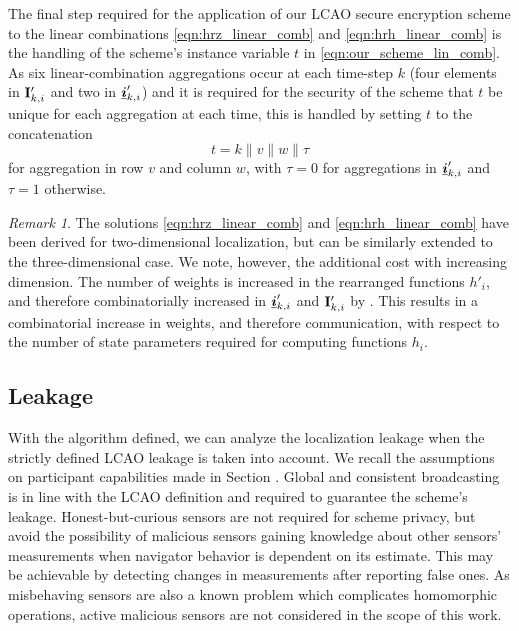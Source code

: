 \documentclass[10pt,letterpaper,oneside,twocolumn,journal]{IEEEtran}
\theoremstyle{definition}
\theoremstyle{definition}
\theoremstyle{remark}
\newtheorem*{remark}{Remark}
\begin{document}
The final step required for the application of our LCAO secure encryption scheme to the linear combinations \eqref{eqn:hrz_linear_comb} and \eqref{eqn:hrh_linear_comb} is the handling of the scheme's instance variable $t$ in \eqref{eqn:our_scheme_lin_comb}. As six linear-combination aggregations occur at each time-step $k$ (four elements in ${{\mathbf{I}}}'_{k,i}$ and two in ${\boldsymbol{\underline{i}}}'_{k,i}$) and it is required for the security of the scheme that $t$ be unique for each aggregation at each time, this is handled by setting $t$ to the concatenation 
\begin{equation}
    t=k\mathbin\|v\mathbin\|w\mathbin\|\tau
\end{equation}
for aggregation in row $v$ and column $w$, with $\tau=0$ for aggregations in ${\boldsymbol{\underline{i}}}'_{k,i}$ and $\tau=1$ otherwise.
\begin{remark}
    The solutions \eqref{eqn:hrz_linear_comb} and \eqref{eqn:hrh_linear_comb} have been derived for two-dimensional localization, but can be similarly extended to the three-dimensional case. We note, however, the additional cost with increasing dimension. The number of weights is increased in the rearranged functions $h'_i$, and therefore combinatorially increased in ${\boldsymbol{\underline{i}}}'_{k,i}$ and ${{\mathbf{I}}}'_{k,i}$ by . This results in a combinatorial increase in weights, and therefore communication, with respect to the number of state parameters required for computing functions $h_i$.
\end{remark}

% 
% 

\subsection{Leakage} \label{subsec:leakage}
With the algorithm defined, we can analyze the localization leakage when the strictly defined LCAO leakage is taken into account. We recall the assumptions on participant capabilities made in Section . Global and consistent broadcasting is in line with the LCAO definition and required to guarantee the scheme's leakage. Honest-but-curious sensors are not required for scheme privacy, but avoid the possibility of malicious sensors gaining knowledge about other sensors' measurements when navigator behavior is dependent on its estimate. This may be achievable by detecting changes in measurements after reporting false ones. As misbehaving sensors are also a known problem which complicates homomorphic operations, active malicious sensors are not considered in the scope of this work.
\end{document}
